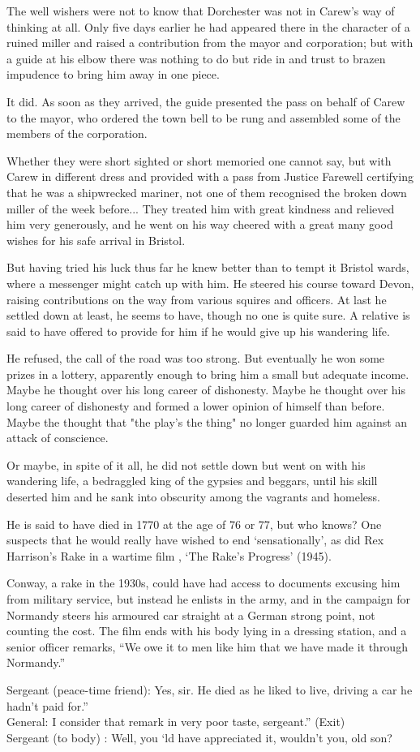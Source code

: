 The well wishers were not to know that Dorchester was not in Carew's way of thinking at all. Only five days earlier he had appeared there in the character of a ruined miller and raised a contribution from the mayor and corporation; but with a guide at his elbow there was nothing to do but ride in and trust to brazen impudence to bring him away in one piece.

It did.
 As soon as they arrived, the guide presented the pass on behalf of Carew to the mayor, who ordered the town bell to be rung and assembled some of the members of the corporation.

Whether they were short sighted or short memoried one cannot say, but with Carew in different dress and provided with a pass from Justice Farewell certifying that he was a shipwrecked mariner, not one of them recognised the broken down miller of the week before... They treated him with great kindness and relieved him very generously, and he went on his way cheered with a great many good wishes for his safe arrival in Bristol.

But having tried his luck thus far he knew better than to tempt it Bristol wards, where a messenger might catch up with him. He steered his course toward Devon, raising contributions on the way from various squires and officers.
 At last he settled down   at least, he seems to have, though no one is quite sure. A relative is said to have offered to provide for him if he would give up his wandering life.

He refused, the call of the road was too strong. But eventually he won some prizes in a lottery, apparently enough to bring him a small but adequate income. Maybe he thought over his long career of dishonesty. Maybe he thought over his long career of dishonesty and formed a lower opinion of himself than before. Maybe the thought that "the play's the thing" no longer guarded him against an attack of conscience.

Or maybe, in spite of it all, he did not settle down but went on with his wandering life, a bedraggled king of the gypsies and beggars, until his skill deserted him and he sank into obscurity among the vagrants and homeless.

He is said to have died in 1770 at the age of 76 or 77, but who knows? One suspects that he would really have wished to end ‘sensationally’, as did Rex Harrison’s Rake in a wartime film  , ‘The Rake’s Progress’ (1945).

Conway, a rake  in the 1930s, could have had access to  documents excusing him from military service, but instead he enlists in the army, and in the campaign for Normandy  steers his armoured car straight at a German strong point, not counting the cost.  The film ends with his body lying in a dressing station, and a senior officer remarks, “We owe it to men like him that we have made it through Normandy.” 

   Sergeant (peace-time friend):  Yes, sir. He died as he liked to live, driving a car he hadn’t paid for.”\\
   General:  I consider that remark in very poor taste, sergeant.” (Exit)\\
   Sergeant (to body) :  Well, you ‘ld have appreciated it, wouldn’t you, old son?\\


    
